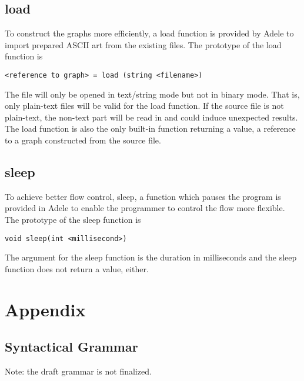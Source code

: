 \documentclass[11pt,letterpaper]{article}
\begin{document}
\subsection {load}
To construct the graphs more efficiently, a load function is provided by Adele to import prepared ASCII art from the existing files. The prototype of the load function is
\begin{lstlisting}[tabsize=4]
	<reference to graph> = load (string <filename>)
\end{lstlisting}	
The file will only be opened in text/string mode but not in binary mode. That is, only plain-text files will be valid for the load function. If the source file is not plain-text, the non-text part will be read in and could induce unexpected results. The load function is also the only built-in function returning a value, a reference to a graph constructed from the source file.

\subsection {sleep}
To achieve better flow control, sleep, a function which pauses the program is provided in Adele to enable the programmer to control the flow more flexible. The prototype of the sleep function is
\begin{lstlisting}[tabsize=4]
	void sleep(int <millisecond>)
\end{lstlisting}	
The argument for the sleep function is the duration in milliseconds and the sleep function does not return a value, either.

\pagebreak
\section {Appendix}
\subsection {Syntactical Grammar}
Note: the draft grammar is not finalized.
\end{document}
